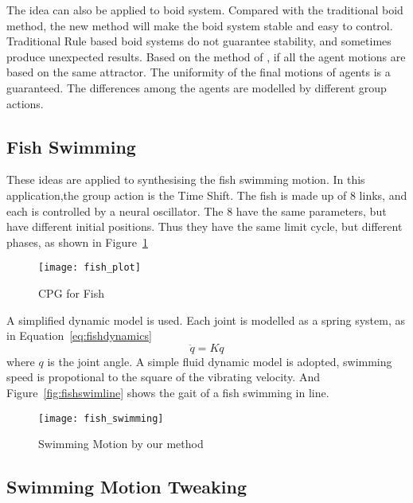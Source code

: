 The idea can also be applied to boid system\citep{reynolds1987flocks}.
Compared with the traditional boid method, the new method will make the boid system stable and easy to control.
Traditional Rule based boid systems do not guarantee stability, and sometimes produce unexpected results.
Based on the method of \moit, if all the agent motions are based on the same attractor.
The uniformity of the final motions of agents is a guaranteed.
The differences  among the agents are modelled by different group actions.

\subsection*{Fish Swimming}
These ideas are applied to synthesising the fish swimming motion.
In this application,the group action is the Time Shift.
The fish is made up of 8 links, and each {\dof} is controlled by a neural oscillator.
The $8$ \cpg have the same parameters, but have different initial positions. 
Thus they have the same limit cycle, but different phases, as shown in Figure~\ref{fig:fishplot}



\begin{figure}[!htbp]
  \begin{center}
      \texttt{[image: fish\_plot]}
    \caption{CPG for Fish}
    \label{fig:fishplot}
\end{center}
\end{figure}




A simplified dynamic model is used.
Each joint is modelled as a spring system, as in Equation~\ref{eq:fishdynamics}
\begin{equation}
\label{eq:fishdynamics}
\ddot{q}=Kq
\end{equation}
where $q$ is the joint angle.
A simple fluid dynamic model is adopted,  swimming speed is propotional to the square of the vibrating velocity.
And Figure~\ref{fig:fishswimline} shows the gait of a fish swimming in line.
\begin{figure}[!htbp]
  \begin{center}
      \texttt{[image: fish\_swimming]}
    \caption{Swimming Motion by our method}
    \label{fig:fishswimming}
\end{center}
\end{figure}


\subsection{Swimming Motion Tweaking}

